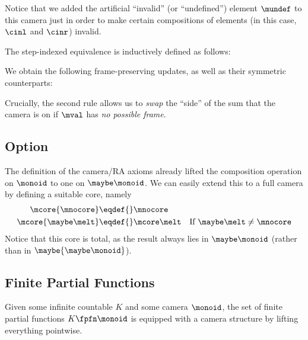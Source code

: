 Notice that we added the artificial ``invalid'' (or ``undefined'') element $\mundef$ to this camera just in order to make certain compositions of elements (in this case, $\cinl$ and $\cinr$) invalid.

The step-indexed equivalence is inductively defined as follows:
\begin{mathpar}


\end{mathpar}


We obtain the following frame-preserving updates, as well as their symmetric counterparts:
Crucially, the second rule allows us to \emph{swap} the ``side'' of the sum that the camera is on if $\mval$ has \emph{no possible frame}.

\subsection{Option}

The definition of the camera/RA axioms already lifted the composition operation on $\monoid$ to one on $\maybe\monoid$.
We can easily extend this to a full camera by defining a suitable core, namely
\begin{align*}
  \mcore{\mnocore} \eqdef{}& \mnocore & \\
  \mcore{\maybe\melt} \eqdef{}& \mcore\melt & \text{If $\maybe\melt \neq \mnocore$}
\end{align*}
Notice that this core is total, as the result always lies in $\maybe\monoid$ (rather than in $\maybe{\mathord{\maybe\monoid}}$).

\subsection{Finite Partial Functions}
\label{sec:fpfnm}

Given some infinite countable $K$ and some camera $\monoid$, the set of finite partial functions $K \fpfn \monoid$ is equipped with a camera structure by lifting everything pointwise.

